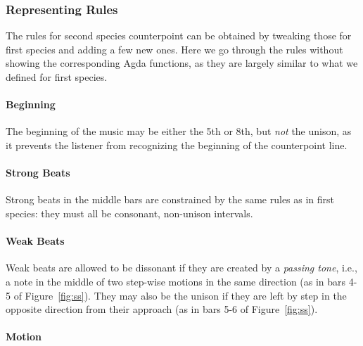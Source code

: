 \subsubsection{Representing Rules}

The rules for second species counterpoint can be obtained by
tweaking those for first species and adding a few new ones.
Here we go through the rules without showing the corresponding
Agda functions, as they are largely similar to what we defined for
first species.

\paragraph{Beginning}

The beginning of the music may be either the 5th or 8th, but
\emph{not} the unison, as it prevents the listener from recognizing
the beginning of the counterpoint line.

\paragraph{Strong Beats}

Strong beats in the middle bars are constrained by the same rules
as in first species: they must all be consonant, non-unison intervals.

\paragraph{Weak Beats}

Weak beats are allowed to be dissonant if they are created by a
\emph{passing tone}, i.e., a note in the middle of two step-wise
motions in the same direction (as in bars 4-5 of Figure~\ref{fig:ss}).
They may also be the unison if they are left by step in the opposite
direction from their approach (as in bars 5-6 of Figure~\ref{fig:ss}).

\paragraph{Motion}

